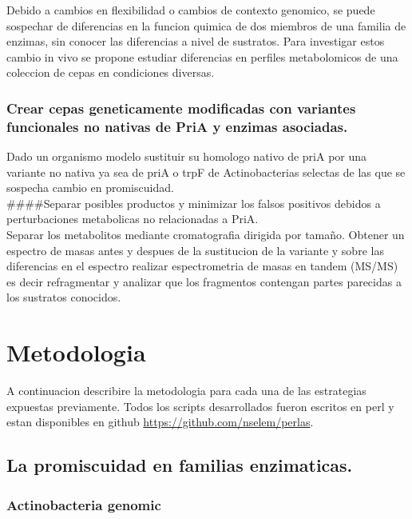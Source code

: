 \documentclass[12pt,twoside]{reedthesis}
\begin{document}
  Debido a cambios en flexibilidad o cambios de contexto genomico, se
  puede sospechar de diferencias en la funcion quimica de dos miembros de
  una familia de enzimas, sin conocer las diferencias a nivel de
  sustratos. Para investigar estos cambio in vivo se propone estudiar
  diferencias en perfiles metabolomicos de una coleccion de cepas en
  condiciones diversas.
  
  \subsubsection{Crear cepas geneticamente modificadas con variantes
  funcionales no nativas de PriA y enzimas
  asociadas.}\label{crear-cepas-geneticamente-modificadas-con-variantes-funcionales-no-nativas-de-pria-y-enzimas-asociadas.}
  
  Dado un organismo modelo sustituir su homologo nativo de priA por una
  variante no nativa ya sea de priA o trpF de Actinobacterias selectas de
  las que se sospecha cambio en promiscuidad.\\
  \#\#\#\#Separar posibles productos y minimizar los falsos positivos
  debidos a perturbaciones metabolicas no relacionadas a PriA.\\
  Separar los metabolitos mediante cromatografia dirigida por tamaño.
  Obtener un espectro de masas antes y despues de la sustitucion de la
  variante y sobre las diferencias en el espectro realizar espectrometria
  de masas en tandem (MS/MS) es decir refragmentar y analizar que los
  fragmentos contengan partes parecidas a los sustratos conocidos.
  
  \section{Metodologia}\label{metodologia}
  
  A continuacion describire la metodologia para cada una de las
  estrategias expuestas previamente. Todos los scripts desarrollados
  fueron escritos en perl y estan disponibles en github
  \url{https://github.com/nselem/perlas}.
  
  \subsection{La promiscuidad en familias
  enzimaticas.}\label{la-promiscuidad-en-familias-enzimaticas.-1}
  
  \subsubsection{Actinobacteria genomic}\label{actinobacteria-genomic}
  
\end{document}
